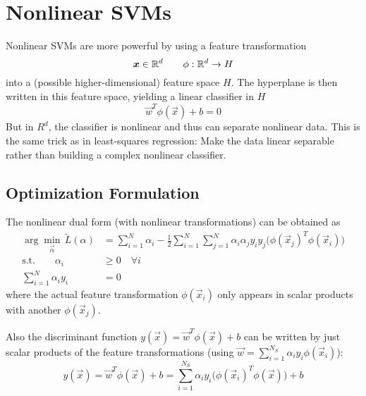 	\section{Nonlinear SVMs}
		Nonlinear SVMs are more powerful by using a feature transformation
		\begin{equation}
			\bm{x} \in \mathbb{R}^d \qquad \phi : \mathbb{R}^d \rightarrow H
		\end{equation}
		into a (possible higher-dimensional) feature space \(H\). The hyperplane is then written in this feature space, yielding a linear classifier in \(H\)
		\begin{equation}
			\vec{w}^T \phi(\vec{x}) + b = 0
		\end{equation}
		But in \(R^d\), the classifier is nonlinear and thus can separate nonlinear data. This is the same trick as in least-squares regression: Make the data linear separable rather than building a complex nonlinear classifier.

		\subsection{Optimization Formulation}
			The nonlinear dual form (with nonlinear transformations) can be obtained as
			\begin{align}
				\arg\min_{ \vec{\alpha} } \, \tilde{L}(\alpha) & = \sum_{i = 1}^{N} \alpha_i - \frac{1}{2} \sum_{i = 1}^{N} \sum_{j = 1}^{N} \alpha_i \alpha_j y_i y_j \big(\phi(\vec{x}_j)^T \phi(\vec{x}_i)\big) \\
				\textrm{s.t.} \qquad
				\alpha_i                                       & \geq 0 \quad\forall i                                                                                                                             \\
				\sum_{i = 1}^{N} \alpha_i y_i                  & = 0
			\end{align}
			where the actual feature transformation \( \phi(\vec{x}_i) \) only appears in scalar products with another \( \phi(\vec{x}_j) \).

			Also the discriminant function \( y(\vec{x}) = \vec{w}^T \phi(\vec{x}) + b \) can be written by just scalar products of the feature transformations (using \( \vec{w} = \sum_{i = 1}^{N_S} \alpha_i y_i \phi(\vec{x}_i) \)):
			\begin{equation}
				y(\vec{x}) = \vec{w}^T \phi(\vec{x}) + b = \sum_{i = 1}^{N_S} \alpha_i y_i \big(\phi(\vec{x}_i)^T \phi(\vec{x})\big) + b
			\end{equation}

